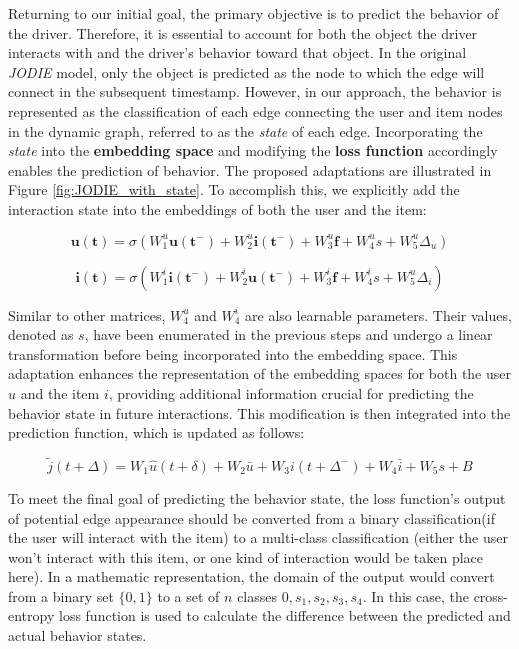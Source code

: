Returning to our initial goal, the primary objective is to predict the behavior of the driver. Therefore, it is essential to account for both the object the driver interacts with and the driver’s behavior toward that object. In the original \textit{JODIE} model, only the object is predicted as the node to which the edge will connect in the subsequent timestamp. However, in our approach, the behavior is represented as the classification of each edge connecting the user and item nodes in the dynamic graph, referred to as the \textit{state} of each edge. Incorporating the \textit{state} into the \textbf{embedding space} and modifying the \textbf{loss function} accordingly enables the prediction of behavior. The proposed adaptations are illustrated in Figure \ref{fig:JODIE_with_state}. To accomplish this, we explicitly add the interaction state into the embeddings of both the user and the item: 


\[ \mathbf{u(t)} = \sigma (W_1^u \mathbf{u(t^-)} + W_2^u \mathbf{i(t^-)} + W_3^u \mathbf{f} + W^u_4s+W^u_5\Delta _u) \]

\[ \mathbf{i(t)} = \sigma (W_1^i \mathbf{i(t^-)} + W_2^i \mathbf{u(t^-)} + W_3^i \mathbf{f} + W^i_4s+W^u_5 \Delta _i) \]


Similar to other matrices, $W^u_4$ and $W^i_4$ are also learnable parameters. Their values, denoted as $s$, have been enumerated in the previous steps and undergo a linear transformation before being incorporated into the embedding space. This adaptation enhances the representation of the embedding spaces for both the user $u$ and the item $i$, providing additional information crucial for predicting the behavior state in future interactions. This modification is then integrated into the prediction function, which is updated as follows:

\[ \tilde{j}(t+\Delta)=W_1\hat{u}(t+\delta)+W_2\bar{u}+W_3i(t+\Delta ^-)+W_4\bar{i}+W_5s+B \]

To meet the final goal of predicting the behavior state, the loss function's output  of potential edge appearance should be converted from a binary classification(if the user will interact with the item) to a multi-class classification (either the user won't interact with this item, or one kind of interaction would be taken place here). In a mathematic representation, the domain of the output would convert from a binary set $\{0,1\}$ to a set of $n$ classes ${0,s_1,s_2,s_3,s_4}$. In this case, the cross-entropy loss function is used to calculate the difference between the predicted and actual behavior states. 



